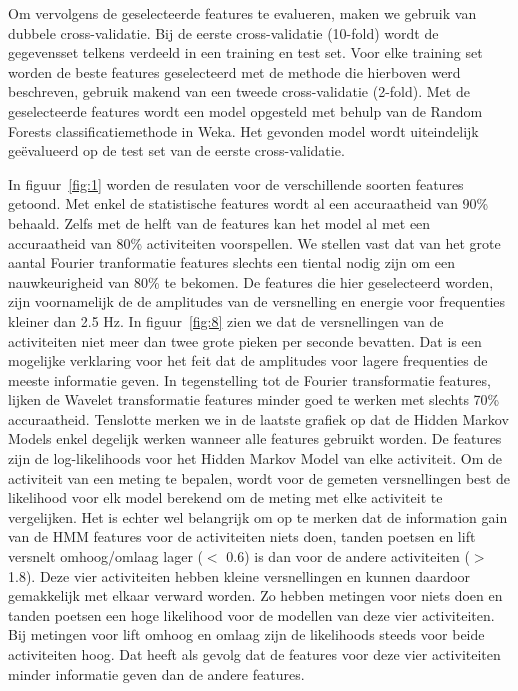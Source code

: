 \documentclass{article}
\begin{document}
Om vervolgens de geselecteerde features te evalueren, maken we gebruik van dubbele cross-validatie. Bij de eerste cross-validatie (10-fold) wordt de gegevensset telkens verdeeld in een training en test set. Voor elke training set worden de beste features geselecteerd met de methode die hierboven werd beschreven, gebruik makend van een tweede cross-validatie (2-fold). Met de geselecteerde features wordt een model opgesteld met behulp van de Random Forests classificatiemethode in Weka. Het gevonden model wordt uiteindelijk ge\"evalueerd op de test set van de eerste cross-validatie.
	
In figuur~\ref{fig:1} worden de resulaten voor de verschillende soorten features getoond. Met enkel de statistische features wordt al een accuraatheid van 90\% behaald. Zelfs met de helft van de features kan het model al met een accuraatheid van 80\% activiteiten voorspellen. We stellen vast dat van het grote aantal Fourier tranformatie features slechts een tiental nodig zijn om een nauwkeurigheid van 80\% te bekomen. De features die hier geselecteerd worden, zijn voornamelijk de de amplitudes van de versnelling en energie voor frequenties kleiner dan 2.5 Hz. In figuur~\ref{fig:8} zien we dat de versnellingen van de activiteiten niet meer dan twee grote pieken per seconde bevatten. Dat is een mogelijke verklaring voor het feit dat de amplitudes voor lagere frequenties de meeste informatie geven.  In tegenstelling tot de Fourier transformatie features, lijken de Wavelet transformatie features minder goed te werken met slechts 70\% accuraatheid. Tenslotte merken we in de laatste grafiek op dat de Hidden Markov Models enkel degelijk werken wanneer alle features gebruikt worden. De features zijn de log-likelihoods voor het Hidden Markov Model van elke activiteit. Om de activiteit van een meting te bepalen, wordt voor de gemeten versnellingen best de likelihood voor elk model berekend om de meting met elke activiteit te vergelijken. Het is echter wel belangrijk om op te merken dat de information gain van de HMM features voor de activiteiten niets doen, tanden poetsen en lift versnelt omhoog/omlaag lager ($<$ 0.6) is dan voor de andere activiteiten ($>$ 1.8). Deze vier activiteiten hebben kleine versnellingen en kunnen daardoor gemakkelijk met elkaar verward worden. Zo hebben metingen voor niets doen en tanden poetsen een hoge likelihood voor de modellen van deze vier activiteiten. Bij metingen voor lift omhoog en omlaag zijn de likelihoods steeds voor beide activiteiten hoog. Dat heeft als gevolg dat de features voor deze vier activiteiten minder informatie geven dan de andere features.
\end{document}
